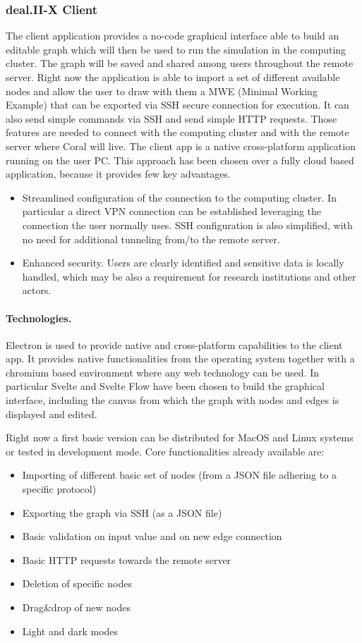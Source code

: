 \documentclass[a4paper,12pt]{article}
\begin{document}
\subsubsection{deal.II-X Client}

The client application provides a no-code graphical interface able to build an editable graph which will then be used to run the simulation in the computing cluster. The graph will be saved and shared among users throughout the remote server. Right now the application is able to import a set of different available nodes and allow the user to draw with them a MWE (Minimal Working Example) that can be exported via SSH secure connection for execution. It can also send simple commands via SSH and send simple HTTP requests. Those features are needed to connect with the computing cluster and with the remote server where Coral will live. The client app is a native cross-platform application running on the user PC. This approach has been chosen over a fully cloud based application, because it provides few key advantages.
\begin{itemize}
  \item Streamlined configuration of the connection to the computing cluster. In particular a direct VPN connection can be established leveraging the connection the user normally uses. SSH configuration is also simplified, with no need for additional tunneling from/to the remote server.
  \item Enhanced security. Users are clearly identified and sensitive data is locally handled, which may be also a requirement for research institutions and other actors.
\end{itemize}

\paragraph{Technologies.}
Electron is used to provide native and cross-platform capabilities to the client app. It provides native functionalities from the operating system together with a chromium based environment where any web technology can be used. In particular Svelte and Svelte Flow have been chosen to build the graphical interface, including the canvas from which the graph with nodes and edges is displayed and edited.

Right now a first basic version can be distributed for MacOS and Linux systems or tested in development mode. Core functionalities already available are:
\begin{itemize}
  \item Importing of different basic set of nodes (from a JSON file adhering to a specific protocol)
  \item Exporting the graph via SSH (as a JSON file)
  \item Basic validation on input value and on new edge connection
  \item Basic HTTP requests towards the remote server
  \item Deletion of specific nodes
  \item Drag\&drop of new nodes
  \item Light and dark modes
\end{itemize}
\end{document}
